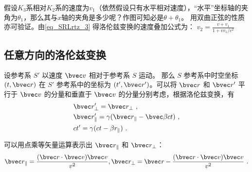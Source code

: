 假设$K_3$系相对$K_2$系的速度为$v_1$（依然假设只有水平相对速度），“水平”坐标轴的夹角为$\theta_1$，那么其与$x$轴的夹角是多少呢？作图可知必是$\theta+\theta_1$。
用双曲正弦的性质亦可验证。由\autoref{eq_SRLrtz_3} 得洛伦兹变换的速度叠加公式为：
$v_2=\frac{v+v_1}{1+vv_1/c^2}$


\subsection{任意方向的洛伦兹变换}
设参考系 $S'$ 以速度 $\bvec v$ 相对于参考系 $S$ 运动。
那么 $S$ 参考系中时空坐标 $(t,\bvec r)$ 在 $S'$ 参考系中的坐标为 $(t',\bvec r')$。可以将 $\bvec r$ 和 $\bvec r'$ 平行于 $\bvec v$ 的分量和垂直于 $\bvec v$ 的分量分别考虑，根据洛伦兹变换，有
\begin{equation}
\begin{aligned}
&\bvec r'_{\perp}=\bvec r_{\perp}~,\\
&\bvec r'_{\parallel}=\gamma(\bvec r_{\parallel}-\bvec \beta ct)~,\\
&ct'=\gamma(ct-\beta r_{\parallel})~.
\end{aligned}
\end{equation}

可以用点乘等矢量运算表示出 $\bvec r_\parallel$ 和 $\bvec r_\perp$：
\begin{equation}
\bvec r_{\parallel}=\frac{(\bvec r\cdot \bvec v)\bvec v}{v^2},\bvec r_{\perp}=\bvec r-\frac{(\bvec r\cdot \bvec v)\bvec v}{v^2}~.
\end{equation}

